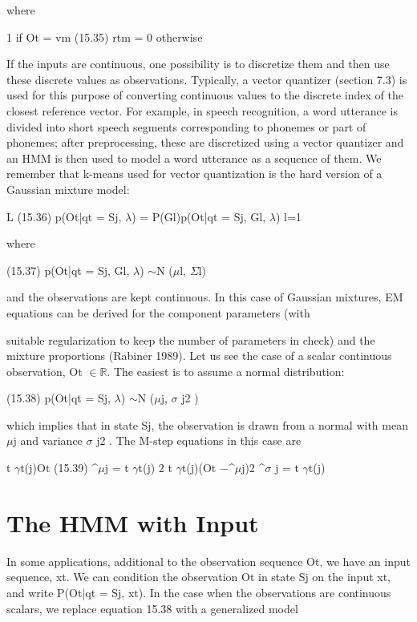 where

1 if Ot = vm (15.35) rtm = 0 otherwise

If the inputs are continuous, one possibility is to discretize them and then use these discrete values as observations. Typically, a vector quantizer (section 7.3) is used for this purpose of converting continuous values to the discrete index of the closest reference vector. For example, in speech recognition, a word utterance is divided into short speech segments corresponding to phonemes or part of phonemes; after preprocessing, these are discretized using a vector quantizer and an HMM is then used to model a word utterance as a sequence of them. We remember that k-means used for vector quantization is the hard version of a Gaussian mixture model:

L (15.36) p(Ot|qt = Sj, $\lambda$) = P(Gl)p(Ot|qt = Sj, Gl, $\lambda$) l=1

where

(15.37) p(Ot|qt = Sj, Gl, $\lambda$) $\sim$N ($\mu$l, $\Sigma$l)

and the observations are kept continuous. In this case of Gaussian mixtures, EM equations can be derived for the component parameters (with

suitable regularization to keep the number of parameters in check) and the mixture proportions (Rabiner 1989). Let us see the case of a scalar continuous observation, Ot $\in$$\mathbb{R}$. The easiest is to assume a normal distribution:

(15.38) p(Ot|qt = Sj, $\lambda$) $\sim$N ($\mu$j, $\sigma$ j2 )

which implies that in state Sj, the observation is drawn from a normal with mean $\mu$j and variance $\sigma$ j2 . The M-step equations in this case are

t $\gamma$t(j)Ot (15.39) \textasciicircum{}$\mu$j = t $\gamma$t(j) 2 t $\gamma$t(j)(Ot $-$\textasciicircum{}$\mu$j)2 \textasciicircum{}$\sigma$ j = t $\gamma$t(j)

\section{The HMM with Input}

In some applications, additional to the observation sequence Ot, we have an input sequence, xt. We can condition the observation Ot in state Sj on the input xt, and write P(Ot|qt = Sj, xt). In the case when the observations are continuous scalars, we replace equation 15.38 with a generalized model

